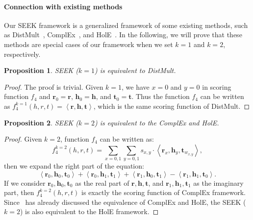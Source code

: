 \documentclass[11pt,a4paper]{article}
\newcommand{\SegVec}[1]{\mathbf{#1}}
\newtheorem{proposition}{Proposition}
\begin{document}
\paragraph{Connection with existing methods}
Our SEEK framework is a generalized framework of some existing methods, such as DistMult~\cite{yang2015embedding}, ComplEx~\cite{trouillon2016complex}, and HolE~\cite{nickel2016holographic}. In the following, we will prove that these methods are special cases of our framework when we set $k=1$ and $k=2$, respectively.
\begin{proposition}
	SEEK ($k=1$) is equivalent to DistMult.
\end{proposition}
\begin{proof}
	The proof is trivial. Given $k=1$, we have $x=0$ and $y=0$ in scoring function $f_4$ and $\SegVec{r}_0 = \SegVec{r}$, $\SegVec{h}_0 = \SegVec{h}$, and $\SegVec{t}_0 = \SegVec{t}$. Thus the function $f_4$ can be written as $f_4^{k=1}(h, r, t) = \left< \SegVec{r}, \SegVec{h}, \SegVec{t}\right>$, which is the same scoring function of DistMult.
\end{proof}
\begin{proposition}
	SEEK ($k=2$) is equivalent to the ComplEx and HolE.
\end{proposition}
\begin{proof}
	Given $k=2$, function $f_4$ can be written as:
	$$
	f_4^{k=2}(h, r, t) = \sum_{x=0, 1} \sum_{y=0, 1} s_{x, y} \cdot \left< \SegVec{r}_x, \SegVec{h}_y, \SegVec{t}_{w_{x, y}} \right>,
	$$
	then we expand the right part of the equation:
	$$
	\left< \SegVec{r}_0, \SegVec{h}_0, \SegVec{t}_0 \right> + \left< \SegVec{r}_0, \SegVec{h}_1, \SegVec{t}_1 \right>
	+ \left< \SegVec{r}_1, \SegVec{h}_0, \SegVec{t}_1 \right> - \left< \SegVec{r}_1, \SegVec{h}_1, \SegVec{t}_0 \right>.
	$$
	If we consider $\SegVec{r}_0, \SegVec{h}_0, \SegVec{t}_0$ as the real part of $\SegVec{r}, \SegVec{h}, \SegVec{t}$, and $\SegVec{r}_1, \SegVec{h}_1, \SegVec{t}_1$ as the imaginary part,
	then $f_4^{k=2}(h, r, t)$ is exactly the scoring function of ComplEx framework. Since~\cite{hayashi2017equivalence} has already discussed the equivalence of ComplEx and HolE, the SEEK ($k=2$) is also equivalent to the HolE framework.
\end{proof}
\end{document}
